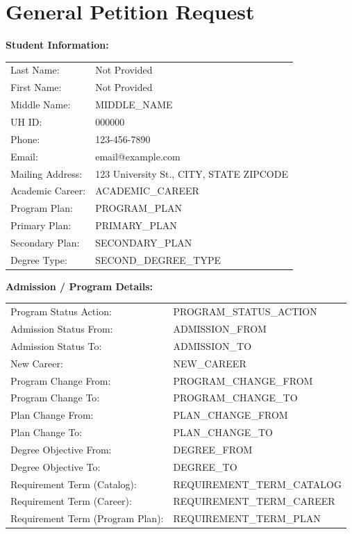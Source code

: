 \documentclass[12pt]{article}
\begin{document}
\section*{General Petition Request}

\textbf{Student Information:}

\begin{tabular}{ll}
Last Name: & Not Provided \\
First Name: & Not Provided \\
Middle Name: & MIDDLE_NAME \\
UH ID: & 000000 \\
Phone: & 123-456-7890 \\
Email: & email@example.com \\
Mailing Address: & 123 University St., CITY, STATE ZIPCODE \\
Academic Career: & ACADEMIC_CAREER \\
Program Plan: & PROGRAM_PLAN \\
Primary Plan: & PRIMARY_PLAN \\
Secondary Plan: & SECONDARY_PLAN \\
Degree Type: & SECOND_DEGREE_TYPE \\
\end{tabular}

\vspace{0.5cm}

\textbf{Admission / Program Details:}

\begin{tabular}{ll}
Program Status Action: & PROGRAM_STATUS_ACTION \\
Admission Status From: & ADMISSION_FROM \\
Admission Status To: & ADMISSION_TO \\
New Career: & NEW_CAREER \\
Program Change From: & PROGRAM_CHANGE_FROM \\
Program Change To: & PROGRAM_CHANGE_TO \\
Plan Change From: & PLAN_CHANGE_FROM \\
Plan Change To: & PLAN_CHANGE_TO \\
Degree Objective From: & DEGREE_FROM \\
Degree Objective To: & DEGREE_TO \\
Requirement Term (Catalog): & REQUIREMENT_TERM_CATALOG \\
Requirement Term (Career): & REQUIREMENT_TERM_CAREER \\
Requirement Term (Program Plan): & REQUIREMENT_TERM_PLAN \\
\end{tabular}
\end{document}
